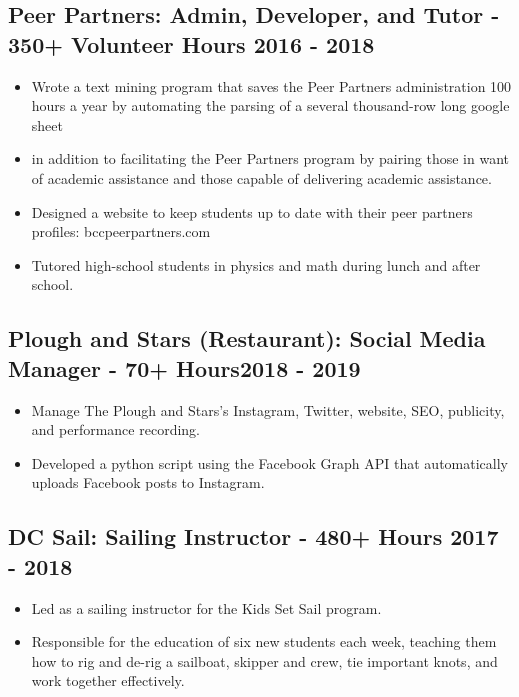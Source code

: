 \documentclass{article}
\begin{document}
\subsection{Peer Partners: Admin, Developer, and Tutor - 350+ Volunteer Hours \hfill 2016 - 2018}
\begin{itemize}[leftmargin=0.5in]
  \setlength\itemsep{0.00em}
  \item Wrote a text mining program that saves the Peer Partners administration 100 hours a year by automating the parsing of a several thousand-row long google sheet
  \item in addition to facilitating the Peer Partners program by pairing those in want of academic assistance and those capable of delivering academic assistance.
  \item Designed a website to keep students up to date with their peer partners profiles: bccpeerpartners.com
  \item Tutored high-school students in physics and math during lunch and after school.
\end{itemize}

\subsection{Plough and Stars (Restaurant): Social Media Manager - 70+ Hours\hfill 2018 - 2019}
\begin{itemize}[leftmargin=0.5in]
  \setlength\itemsep{0.00em}
  \item Manage The Plough and Stars’s Instagram, Twitter, website, SEO, publicity, and performance recording.
  \item Developed a python script using the Facebook Graph API that automatically uploads Facebook posts to Instagram.
\end{itemize}

\subsection{DC Sail: Sailing Instructor - 480+ Hours \hfill 2017 - 2018}
\begin{itemize}[leftmargin=0.5in]
  \setlength\itemsep{0.00em}
  \item Led as a sailing instructor for the Kids Set Sail program.
  \item Responsible for the education of six new students each week,  teaching them how to rig and de-rig a sailboat,  skipper and crew,  tie important knots, and work together effectively.
\end{itemize}
\end{document}
